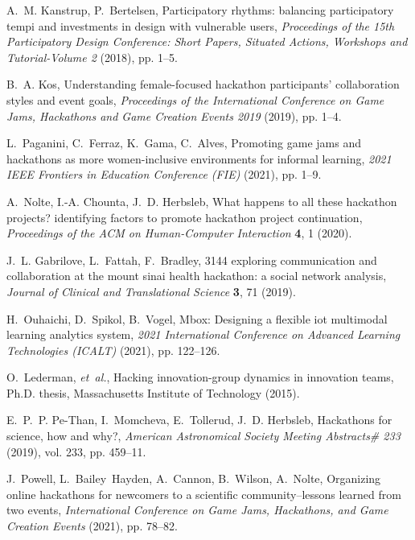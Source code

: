 \documentclass{ieeeaccess}
\begin{document}
\begin{thebibliography}{10}
A.~M. Kanstrup, P.~Bertelsen, Participatory rhythms: balancing participatory
  tempi and investments in design with vulnerable users, {\it Proceedings of
  the 15th Participatory Design Conference: Short Papers, Situated Actions,
  Workshops and Tutorial-Volume 2\/} (2018), pp. 1--5.

B.~A. Kos, Understanding female-focused hackathon participants' collaboration
  styles and event goals, {\it Proceedings of the International Conference on
  Game Jams, Hackathons and Game Creation Events 2019\/} (2019), pp. 1--4.

L.~Paganini, C.~Ferraz, K.~Gama, C.~Alves, Promoting game jams and hackathons
  as more women-inclusive environments for informal learning, {\it 2021 IEEE
  Frontiers in Education Conference (FIE)\/} (2021), pp. 1--9.

A.~Nolte, I.-A. Chounta, J.~D. Herbsleb, What happens to all these hackathon
  projects? identifying factors to promote hackathon project continuation, {\it
  Proceedings of the ACM on Human-Computer Interaction\/} {\bf 4}, 1 (2020).

J.~L. Gabrilove, L.~Fattah, F.~Bradley, 3144 exploring communication and
  collaboration at the mount sinai health hackathon: a social network analysis,
  {\it Journal of Clinical and Translational Science\/} {\bf 3}, 71 (2019).

H.~Ouhaichi, D.~Spikol, B.~Vogel, Mbox: Designing a flexible iot multimodal
  learning analytics system, {\it 2021 International Conference on Advanced
  Learning Technologies (ICALT)\/} (2021), pp. 122--126.

O.~Lederman, {\it et~al.\/}, Hacking innovation-group dynamics in innovation
  teams, Ph.D. thesis, Massachusetts Institute of Technology (2015).

E.~P.~P. Pe-Than, I.~Momcheva, E.~Tollerud, J.~D. Herbsleb, Hackathons for
  science, how and why?, {\it American Astronomical Society Meeting Abstracts\#
  233\/} (2019), vol. 233, pp. 459--11.

J.~Powell, L.~Bailey~Hayden, A.~Cannon, B.~Wilson, A.~Nolte, Organizing online
  hackathons for newcomers to a scientific community--lessons learned from two
  events, {\it International Conference on Game Jams, Hackathons, and Game
  Creation Events\/} (2021), pp. 78--82.


\end{thebibliography}
\end{document}
